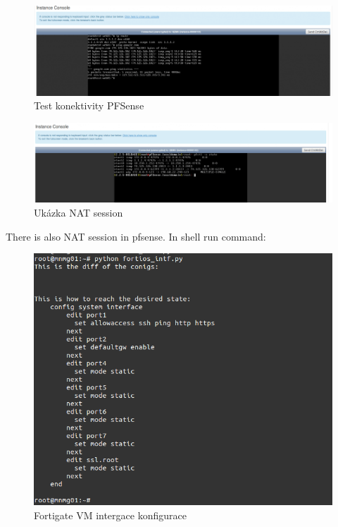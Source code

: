 \begin{figure}[h]
\begin{centering}
\includegraphics[scale=0.45]{images/pfsense_ping}
\par\end{centering}
\caption{Test konektivity PFSense\label{fig:pfsense_ping}}
\end{figure}

\begin{figure}[h]
\begin{centering}
\includegraphics[scale=0.45]{images/pfsense_nat}
\par\end{centering}
\caption{Ukázka NAT session\label{fig:pfsense_nat}}
\end{figure}

There is also NAT session in pfsense. In shell run command:

\begin{figure}[h]
\begin{centering}
\includegraphics[scale=0.45]{images/fortigate_int}
\par\end{centering}
\caption{Fortigate VM intergace konfigurace\label{fig:fortigate_int}}
\end{figure}

